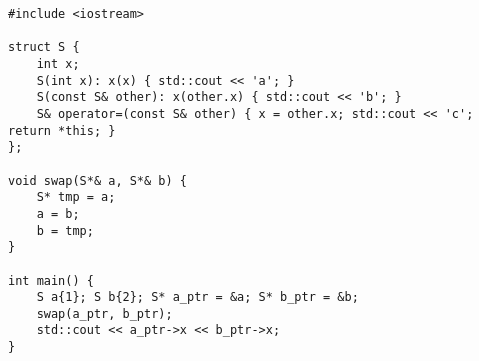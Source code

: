 \begin{lstlisting}[title=\href{https://godbolt.org/z/yUnrbf}{\texttt{godbolt.org/z/yUnrbf}}]
#include <iostream>

struct S { 
    int x;
    S(int x): x(x) { std::cout << 'a'; }
    S(const S& other): x(other.x) { std::cout << 'b'; }
    S& operator=(const S& other) { x = other.x; std::cout << 'c'; return *this; }
};

void swap(S*& a, S*& b) {
    S* tmp = a;
    a = b;
    b = tmp;
}

int main() {
    S a{1}; S b{2}; S* a_ptr = &a; S* b_ptr = &b;
    swap(a_ptr, b_ptr);
    std::cout << a_ptr->x << b_ptr->x;
}
\end{lstlisting}
